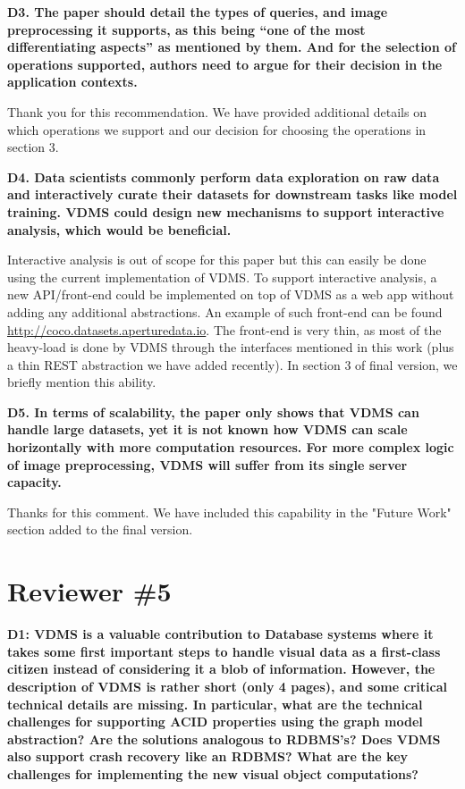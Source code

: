 \documentclass[11pt]{proposalnsf}
\begin{document}
\bigskip
\noindent %
\textbf{
D3. The paper should detail the types of queries, and image preprocessing it supports,
as this being “one of the most differentiating aspects” as mentioned by them.
And for the selection of operations supported, authors need to argue for their
decision in the application contexts.
}\bigskip

Thank you for this recommendation.
We have provided additional details on which operations we support and our
decision for choosing the operations in section 3.

\bigskip
\noindent %
\textbf{
D4. Data scientists commonly perform data exploration on raw data and interactively
curate their datasets for downstream tasks like model training.
VDMS could design new mechanisms to support interactive analysis,
which would be beneficial.
}\bigskip

Interactive analysis is out of scope for this paper but this can easily be done
using the current implementation of VDMS.
To support interactive analysis, a new API/front-end could be implemented on top of
VDMS as a web app without adding any additional abstractions.
An example of such front-end can be found \url{http://coco.datasets.aperturedata.io}.
The front-end is very thin, as most of the heavy-load is done by VDMS through
the interfaces mentioned in this work
(plus a thin REST abstraction we have added recently).
In section 3 of final version, we briefly mention this ability.

\bigskip
\noindent %
\textbf{
D5. In terms of scalability, the paper only shows that VDMS can handle large
datasets, yet it is not known how VDMS can scale horizontally with more
computation resources.
For more complex logic of image preprocessing, VDMS will suffer from its
single server capacity.
}\bigskip

Thanks for this comment.
We have included this capability in the "Future Work" section
added to the final version.

\newpage
\section{Reviewer \#5}

\noindent %
\textbf{
D1: VDMS is a valuable contribution to Database systems where it takes
some first important steps to handle visual data as a first-class citizen
instead of considering it a blob of information. However, the description
of VDMS is rather short (only 4 pages), and some critical technical
details are missing. In particular, what are the technical challenges
for supporting ACID properties using the graph model abstraction? Are
the solutions analogous to RDBMS’s? Does VDMS also support crash
recovery like an RDBMS? What are the key challenges for implementing
the new visual object computations?
}\bigskip
\end{document}
